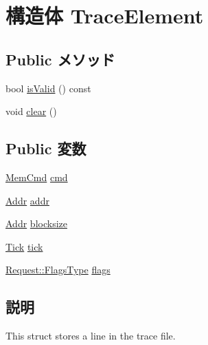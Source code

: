 \hypertarget{structTraceGen_1_1TraceElement}{
\section{構造体 TraceElement}
\label{structTraceGen_1_1TraceElement}
}
\subsection*{Public メソッド}
\begin{DoxyCompactItemize}
\item 
bool \hyperlink{structTraceGen_1_1TraceElement_aac1b70a2ed67ead038c4d3f5ac4d8a81}{isValid} () const 
\item 
void \hyperlink{structTraceGen_1_1TraceElement_ac8bb3912a3ce86b15842e79d0b421204}{clear} ()
\end{DoxyCompactItemize}
\subsection*{Public 変数}
\begin{DoxyCompactItemize}
\item 
\hyperlink{classMemCmd}{MemCmd} \hyperlink{structTraceGen_1_1TraceElement_af88eb56d484b750933cd2ea86594f001}{cmd}
\item 
\hyperlink{base_2types_8hh_af1bb03d6a4ee096394a6749f0a169232}{Addr} \hyperlink{structTraceGen_1_1TraceElement_a0bb77b4ba61e408313e1118250f9278c}{addr}
\item 
\hyperlink{base_2types_8hh_af1bb03d6a4ee096394a6749f0a169232}{Addr} \hyperlink{structTraceGen_1_1TraceElement_ac1ad082ce835505ea433e658c844c8ac}{blocksize}
\item 
\hyperlink{base_2types_8hh_a5c8ed81b7d238c9083e1037ba6d61643}{Tick} \hyperlink{structTraceGen_1_1TraceElement_a4daae57fbf09ee5423d123f5ce330e92}{tick}
\item 
\hyperlink{classRequest_a2da503161d95c65aea559dbabcf570aa}{Request::FlagsType} \hyperlink{structTraceGen_1_1TraceElement_a539ce2286409a81e04ce978c1ea74c18}{flags}
\end{DoxyCompactItemize}


\subsection{説明}
This struct stores a line in the trace file. 

